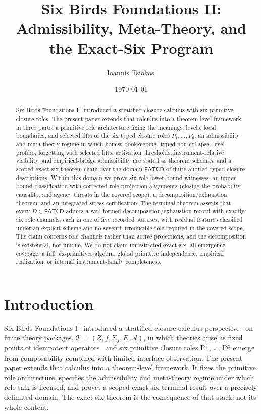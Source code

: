 \documentclass[11pt]{article}
\theoremstyle{definition}
\newcommand{\FATCD}{\ensuremath{\mathsf{FATCD}}}
\newcommand{\Pone}{\ensuremath{\mathrm{P1}}}
\newcommand{\Psix}{\ensuremath{\mathrm{P6}}}
\begin{document}
\title{Six Birds Foundations II:\\[4pt]
Admissibility, Meta-Theory, and the Exact-Six Program}
\author{Ioannis Tsiokos\,}
\date{\today}

\maketitle
\thispagestyle{firstpage}

\begin{abstract}
\noindent
Six Birds Foundations I~\citep{Tsiokos2026SixBirdsFoundations}
introduced a stratified closure calculus with six primitive closure
roles. The present paper extends that calculus
into a theorem-level framework in three parts: a primitive role
architecture fixing the meanings, levels, local boundaries, and
selected lifts of the six typed closure roles \(P_1,\ldots,P_6\); an
admissibility and meta-theory regime in which honest bookkeeping,
typed non-collapse, level profiles, forgetting with selected lifts,
activation thresholds, instrument-relative visibility, and
empirical-bridge admissibility are stated as theorem schemas; and a
scoped exact-six theorem chain over the domain \(\FATCD{}\) of finite
audited typed closure descriptions. Within this domain we prove six
role-lower-bound witnesses, an upper-bound classification with
corrected role-projection alignments (closing the probability,
causality, and agency threats in the covered scope), a
decomposition/exhaustion theorem, and an integrated stress
certification. The terminal theorem asserts that every
\(D \in \FATCD{}\) admits a well-formed decomposition/exhaustion
record with exactly six role channels, each in one of five recorded
statuses, with residual features classified under an explicit scheme
and no seventh irreducible role required in the covered scope. The
claim concerns role channels rather than active projections, and the
decomposition is existential, not unique. We do not claim unrestricted
exact-six, all-emergence coverage, a full six-primitives algebra,
global primitive independence, empirical realization, or internal
instrument-family completeness.
\end{abstract}
 \section{Introduction}\label{sec:introduction}



Six Birds Foundations I~\citep{Tsiokos2026SixBirdsFoundations}
introduced a stratified closure-calculus
perspective~\citep{Anderson1972} on finite theory packages,
\(\mathcal{T} = (Z, f, \Sigma_f, E, \mathcal{A})\), in which theories
arise as fixed points of idempotent
operators~\citep{DaveyPriestley2002} and six primitive closure roles
\Pone{}, \ldots, \Psix{} emerge from composability combined with
limited-interface observation. The present paper extends
that calculus into a theorem-level framework. It fixes the primitive
role architecture, specifies the admissibility and meta-theory regime
under which role talk is licensed, and proves a scoped exact-six
terminal result over a precisely delimited domain. The exact-six
theorem is the consequence of that stack, not its whole content.
\end{document}
